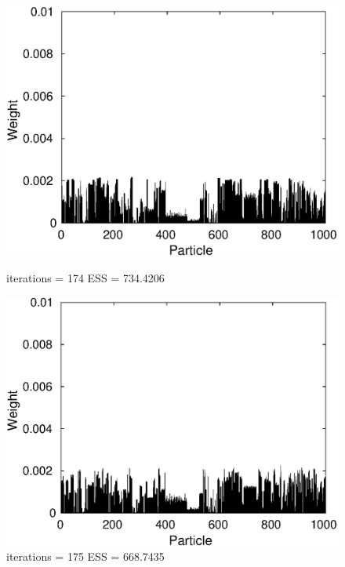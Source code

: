 \documentclass[12pt]{article}
\begin{document}
\begin{figure}[h!]
\begin{minipage}{0.5\textwidth}
		\includegraphics[scale = 0.5]{./Figures/174.eps}
		\caption*{iterations = 174 ESS = 734.4206}
	\end{minipage}%
	\begin{minipage}{0.5\textwidth}
		\centering
		\includegraphics[scale = 0.5]{./Figures/175.eps}
		\caption*{iterations = 175 ESS = 668.7435}
	\end{minipage}
\end{figure}
\end{document}
